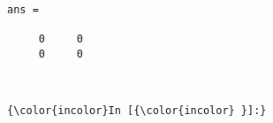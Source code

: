 \documentclass[10pt,dvipdfmx,fleqn]{jarticle}
\begin{document}
    \begin{Verbatim}[commandchars=\\\{\}]

ans =

     0     0
     0     0



    \end{Verbatim}

    \begin{Verbatim}[commandchars=\\\{\}]
{\color{incolor}In [{\color{incolor} }]:} 
\end{Verbatim}



    
    
    
    
\end{document}
